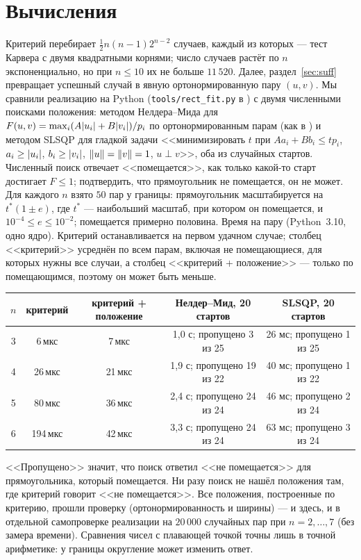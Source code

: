 \documentclass[11pt]{article}
\theoremstyle{definition}
\theoremstyle{remark}
\DeclarePairedDelimiter{\abs}{\lvert}{\rvert}
\DeclarePairedDelimiter{\norm}{\lVert}{\rVert}
\begin{document}
\section{Вычисления}\label{sec:comp}

Критерий перебирает $\tfrac12n(n-1)2^{n-2}$ случаев, каждый из которых --- тест Карвера с двумя квадратными
корнями; число случаев растёт по $n$ экспоненциально, но при $n\le10$ их не больше $11\,520$. Далее, раздел~\ref{sec:suff} превращает успешный случай в явную ортонормированную пару $(u,v)$. Мы сравнили
реализацию на Python (\texttt{tools/rect\_fit.py} в \cite{Repo}) с двумя численными поисками положения:
методом Нелдера--Мида для $F(u,v)=\max_i(A\abs{u_i}+B\abs{v_i})/p_i$ по ортонормированным парам (как в
\cite{Levit2026}) и методом SLSQP для гладкой задачи <<минимизировать $t$ при $Aa_i+Bb_i\le tp_i$,
$a_i\ge\abs{u_i}$, $b_i\ge\abs{v_i}$, $\norm u=\norm v=1$, $u\perp v$>>, оба из случайных стартов. Численный поиск
отвечает <<помещается>>, как только какой-то старт достигает $F\le1$; подтвердить, что прямоугольник не
помещается, он не может. Для каждого $n$ взято $50$ пар у границы: прямоугольник масштабируется на
$t^*(1\pm e)$, где $t^*$ --- наибольший масштаб, при котором он помещается, и $10^{-4}\le e\le10^{-2}$;
помещается примерно половина. Время на пару (Python~3.10, одно ядро). Критерий останавливается на первом
удачном случае; столбец <<критерий>> усреднён по всем парам, включая не помещающиеся, для которых нужны все
случаи, а столбец <<критерий + положение>> --- только по помещающимся, поэтому он может быть меньше.

\begin{center}\small
\begin{tabular}{ccccc}
\toprule
$n$ & критерий & критерий + положение & Нелдер--Мид, 20 стартов & SLSQP, 20 стартов\\
\midrule
3 & 6\,мкс & 7\,мкс & 1,0 с; пропущено 3 из 25 & 26 мс; пропущено 1 из 25\\
4 & 26\,мкс & 21\,мкс & 1,9 с; пропущено 19 из 22 & 40 мс; пропущено 1 из 22\\
5 & 80\,мкс & 36\,мкс & 2,4 с; пропущено 24 из 24 & 46 мс; пропущено 2 из 24\\
6 & 194\,мкс & 42\,мкс & 3,3 с; пропущено 24 из 24 & 63 мс; пропущено 3 из 24\\
\bottomrule
\end{tabular}
\end{center}

\noindent <<Пропущено>> значит, что поиск ответил <<не помещается>> для прямоугольника, который помещается.
Ни разу поиск не нашёл положения там, где критерий говорит <<не помещается>>. Все положения, построенные по критерию, прошли проверку (ортонормированность и ширины) --- и здесь, и в
отдельной самопроверке реализации на $20\,000$ случайных пар при $n=2,\dots,7$ (без замера времени). Сравнения чисел с плавающей точкой точны лишь в точной арифметике: у границы округление может
изменить ответ.
\end{document}
